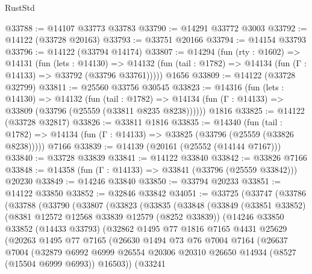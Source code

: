 \begin{lexlean}{RustStd}
\begin{coremodule}
@33788 := @14107 @33773 @33783
@33790 := @14291 @33772 @3003
@33792 := @14122 (@33728 @20163)
@33793 := @33751 @20166
@33794 := @14154 @33793
@33796 := @14122 (@33794 @14174)
@33807 := @14294
    (fun (rty : @1602) =>
    @14131
      (fun (lets : @14130) =>
      @14132 (fun (tail : @1782) => @14134 (fun (Γ : @14133) => @33792 (@33796 @33761)))))
    @1656
@33809 := @14122 (@33728 @32799)
@33811 := @25560 @33756 @30545
@33823 := @14316
    (fun (lets : @14130) =>
    @14132
      (fun (tail : @1782) =>
      @14134 (fun (Γ : @14133) => @33809 (@33796 (@25559 (@33811 @8235 @8238))))))
    @1816
@33825 := @14122 (@33728 @32817)
@33826 := @33811 @1816
@33835 := @14340
    (fun (tail : @1782) => @14134 (fun (Γ : @14133) => @33825 (@33796 (@25559 (@33826 @8238)))))
    @7166
@33839 := @14139 (@20161 (@25552 (@14144 @7167)))
@33840 := @33728 @33839
@33841 := @14122 @33840
@33842 := @33826 @7166
@33848 := @14358 (fun (Γ : @14133) => @33841 (@33796 (@25559 @33842))) @20230
@33849 := @14246 @33840
@33850 := @33794 @20233
@33851 := @14122 @33850
@33852 := @32846 @33842
@34051 := @33725
    (@33747
      (@33786
        (@33788
          (@33790
            (@33807
              (@33823
                (@33835
                  (@33848
                    (@33849
                      (@33851 @33852)
                      (@8381 @12572 @12568 @33839 @12579 (@8252 @33839))
                      (@14246
                        @33850
                        @33852
                        (@14433 @33793)
                        (@32862
                          @1495
                          @77
                          @1816
                          @7165
                          @4431
                          @25629
                          (@20263
                            @1495
                            @77
                            @7165
                            (@26630
                              @1494
                              @73
                              @76
                              @7004
                              @7164
                              (@26637
                                @7004
                                (@32879
                                  @6992
                                  @6999
                                  @26554
                                  @20306
                                  @20310
                                  @26650
                                  @14934
                                  (@8527 (@15504 @6999 @6993))
                                  @16503))
                              (@33241

\end{coremodule}
\end{lexlean}
